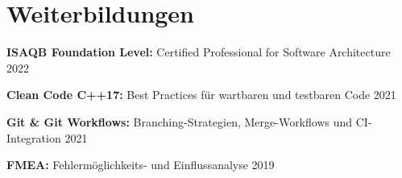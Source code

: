 
\section{Weiterbildungen}

\cventry
{} %
{} %
{} %
{} %
\vspace{-5.0mm}
\begin{cvitems}
\item \textbf{ISAQB Foundation Level:} Certified Professional for Software Architecture \hfill 2022
\item \textbf{Clean Code C++17:} Best Practices für wartbaren und testbaren Code \hfill 2021
\item \textbf{Git \& Git Workflows:} Branching-Strategien, Merge-Workflows und CI-Integration \hfill 2021
\item \textbf{FMEA:} Fehlermöglichkeits- und Einflussanalyse \hfill 2019
\end{cvitems}